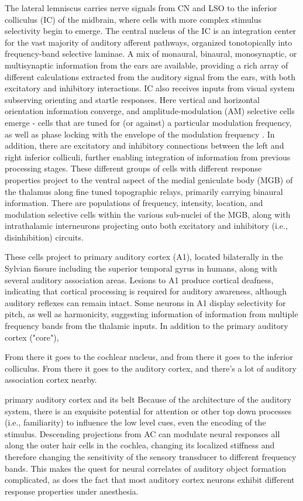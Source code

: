 The lateral lemniscus carries nerve signals from CN and LSO to the inferior colliculus (IC) of the midbrain, where cells with more complex stimulus selectivity begin to emerge. The central nucleus of the IC is an integration center for the vast majority of auditory afferent pathways, organized tonotopically into frequency-band selective laminae. A mix of monaural, binaural, monosynaptic, or multisynaptic information from the ears are available, providing a rich array of different calculations extracted from the auditory signal from the ears, with both excitatory and inhibitory interactions. IC also receives inputs from visual system subserving orienting and startle responses. Here vertical and horizontal orientation information converge, and amplitude-modulation (AM) selective cells emerge - cells that are tuned for (or against) a particular modulation frequency, as well as phase locking with the envelope of the modulation frequency \cite{Rabang2012}. In addition, there are excitatory and inhibitory connections between the left and right inferior colliculi, further enabling integration of information from previous processing stages. These different groups of cells with different response properties project to the ventral aspect of the medial geniculate body (MGB) of the thalamus along fine tuned topographic relays, primarily carrying binaural information. There are populations of frequency, intensity, location, and modulation selective cells within the various sub-nuclei of the MGB, along with intrathalamic interneurons projecting onto both excitatory and inhibitory (i.e., disinhibition) circuits. 

These cells project to primary auditory cortex (A1), located bilaterally in the Sylvian fissure including the superior temporal gyrus in humans, along with several auditory association areas. Lesions to A1 produce cortical deafness, indicating that cortical processing is required for auditory awareness, although auditory reflexes can remain intact. Some neurons in A1 display selectivity for pitch, as well as harmonicity, suggesting information of information from multiple frequency bands from the thalamic inputs. In addition to the primary auditory cortex ("core"), 

From there it goes to the cochlear nucleus, and from there it goes to the inferior colliculus. From there it goes to the auditory cortex, and there's a lot of auditory association cortex nearby. 

primary auditory cortex and its belt
Because of the architecture of the auditory system, there is an exquisite potential for attention or other top down processes (i.e., familiarity) to influence the low level cues, even the encoding of the stimulus. Descending projections from AC can modulate neural responses all along the outer hair cells in the cochlea, changing its localized stiffness and therefore changing the sensitivity of the sensory transducer to different frequency bands\cite{Terreros2015}. This makes the quest for neural correlates of auditory object formation complicated, as does the fact that most auditory cortex neurons exhibit different response properties under anesthesia.

